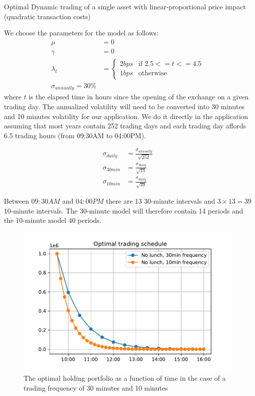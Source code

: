 \documentclass[10pt]{article}
\newenvironment{exercise}[2][Exercise]{\begin{trivlist}
  \item[\hskip \labelsep {\bfseries #1}\hskip \labelsep {\bfseries #2.}]}{\end{trivlist}}
\begin{document}
\begin{exercise}{3}{Optimal Dynamic trading of a single asset with linear-proportional price impact (quadratic transaction costs)}
\begin{itemize}
        We choose the parameters for the model as follows:
        \begin{align*}
          \mu &= 0 \\
          \gamma &= 0 \\
          \lambda_t &= \begin{cases} 2 bps & \text{if } 2.5 <= t <= 4.5 \\ 1 bps & \text{otherwise} \end{cases} \\
          \sigma_{annually} = 30 \%
        \end{align*}
        where $t$ is the elapsed time in hours since the opening of
        the exchange on a given trading day. The annualized volatility will need
        to be converted into 30 minutes and 10 minutes volatility for our
        application. We do it directly in the application assuming that most
        years contain 252 trading days and each trading day affords 6.5 trading
        hours (from 09:30AM to 04:00PM).

        \begin{align*}
          \sigma_{daily} &= \frac{\sigma_{annually}}{\sqrt{252}} \\
          \sigma_{30min} &= \frac{\sigma_{daily} }{\sqrt{13}} \\
          \sigma_{10min} &= \frac{\sigma_{daily} }{\sqrt{39}}
        \end{align*}

        Between $09:30AM$ and $04:00PM$ there are 13 30-minute intervals and $3
        \times 13 = 39$ 10-minute intervals. The 30-minute model will therefore
        contain 14 periods and the 10-minute model 40 periods.
        \begin{figure}[H]
          \centering
          \includegraphics[scale=0.6]{fig1.pdf}
          \caption{The optimal holding portfolio as a function of time in the
            case of a trading frequency of 30 minutes and 10 minutes}
          \label{fig:fig1}
        \end{figure}


\end{itemize}
\end{exercise}
\end{document}
